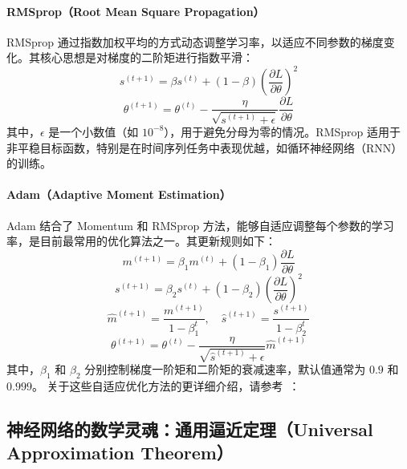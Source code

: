 \paragraph*{RMSprop（Root Mean Square Propagation）}
RMSprop 通过指数加权平均的方式动态调整学习率，以适应不同参数的梯度变化。其核心思想是对梯度的二阶矩进行指数平滑：
\begin{equation}
s^{(t+1)} = \beta s^{(t)} + (1-\beta) \left(\frac{\partial L}{\partial \theta} \right)^2
\end{equation}
\begin{equation}
\theta^{(t+1)} = \theta^{(t)} - \frac{\eta}{\sqrt{s^{(t+1)} + \epsilon}} \frac{\partial L}{\partial \theta}
\end{equation}
其中，\( \epsilon \) 是一个小数值（如 \(10^{-8}\)），用于避免分母为零的情况。RMSprop 适用于非平稳目标函数，特别是在时间序列任务中表现优越，如循环神经网络（RNN）的训练。
\paragraph*{Adam（Adaptive Moment Estimation）}
Adam 结合了 Momentum 和 RMSprop 方法，能够自适应调整每个参数的学习率，是目前最常用的优化算法之一。其更新规则如下：
\begin{equation}
m^{(t+1)} = \beta_1 m^{(t)} + (1-\beta_1) \frac{\partial L}{\partial \theta}
\end{equation}
\begin{equation}
s^{(t+1)} = \beta_2 s^{(t)} + (1-\beta_2) \left(\frac{\partial L}{\partial \theta} \right)^2
\end{equation}
\begin{equation}
\hat{m}^{(t+1)} = \frac{m^{(t+1)}}{1 - \beta_1^t}, \quad \hat{s}^{(t+1)} = \frac{s^{(t+1)}}{1 - \beta_2^t}
\end{equation}
\begin{equation}
\theta^{(t+1)} = \theta^{(t)} - \frac{\eta}{\sqrt{\hat{s}^{(t+1)} + \epsilon}} \hat{m}^{(t+1)}
\end{equation}
其中，\( \beta_1 \) 和 \( \beta_2 \) 分别控制梯度一阶矩和二阶矩的衰减速率，默认值通常为 \(0.9\) 和 \(0.999\)。
关于这些自适应优化方法的更详细介绍，请参考~\cite{kingma2014adam,bengio2012practical}：
\subsection{ 神经网络的数学灵魂：通用逼近定理（Universal Approximation Theorem）}

